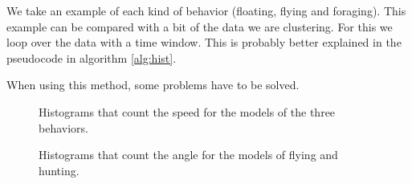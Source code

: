 We take an example of each kind of behavior (floating, flying and foraging).
This example can be compared with a bit of the data we are
clustering. For this we loop over the data with a time window. This is probably
better explained in the pseudocode in algorithm \ref{alg:hist}.

When using this method, some problems have to be solved.


\begin{figure}
  \centering
  \caption{Histograms that count the speed for the models of the three behaviors.}
  \label{fig:modelHistogramsSpeed}
\end{figure}


\begin{figure}
  \centering
  \caption{Histograms that count the angle for the models of flying and hunting.}
  \label{fig:modelHistogramsAngle}
\end{figure}


